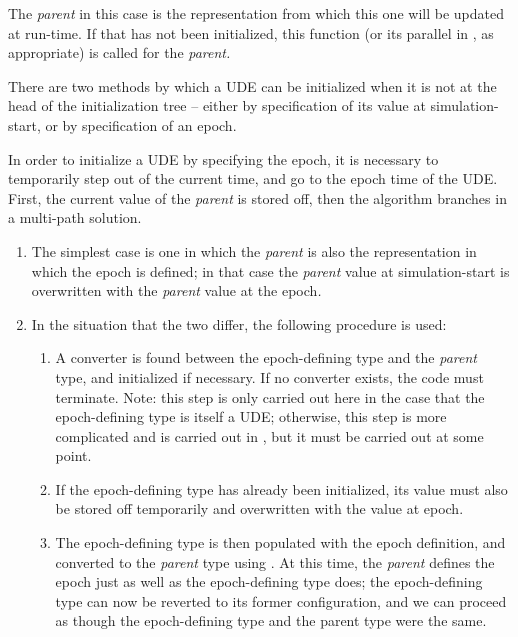 {\begin{enumerate}
{\begin{enumerate}
The \textit{parent} in this case is the representation from which this
one will be updated at run-time.  If that has not been initialized,
this function (or its parallel in , as
appropriate) is called for the \textit{parent.}




There are two methods by which a UDE can be initialized when it is not
at the head of the initialization tree -- either by specification of
its value at simulation-start, or by specification of an epoch.




In order to initialize a UDE by specifying the epoch, it is necessary to
temporarily step out of the current time, and go to the epoch time of
the UDE.  First, the current value of the \textit{parent} is stored
off, then the algorithm branches in a multi-path solution.





\begin{enumerate}
\item The simplest case is one in which the \textit{parent} is also the
representation in which the epoch is defined; in that case the
\textit{parent} value at simulation-start is overwritten with the
\textit{parent }value at the epoch\textit{.}


\item In the situation that the two differ, the following procedure is used:

\begin{enumerate}
\item A converter is found between the epoch-defining type and the
\textit{parent }type, and initialized if necessary.  If no converter
exists, the code must terminate.  Note: this step is only carried out
here in the case that the epoch-defining type is itself a UDE;
otherwise, this step is more complicated and is carried out in
,
but it must be carried out at some
point.
\item If the epoch-defining type has already been initialized, its value
must also be stored off temporarily and overwritten with the value at
epoch.
\item  The epoch-defining type is then populated with the epoch
definition, and converted to the \textit{parent }type using
.
At this time, the \textit{parent}
defines the epoch just as well as the epoch-defining type does; the
epoch-defining type can now be reverted to its former configuration,
and we can proceed as though the epoch-defining type and the parent
type were the same.
\end{enumerate}
\end{enumerate}




\end{enumerate}}
\end{enumerate}}

